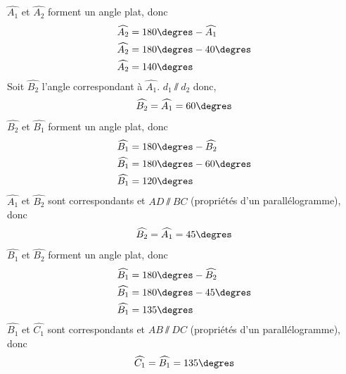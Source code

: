 %
%
    \begin{tasks}
        \task
        $\widehat{A_1}$ et $\widehat{A_2}$ forment un angle plat, donc
        \begin{align*}
            \widehat{A_2} & = 180\degres - \widehat{A_1} \\
            \widehat{A_2} & = 180\degres - 40\degres     \\
            \widehat{A_2} & = 140\degres                 \\
        \end{align*}
        \task
        Soit $\widehat{B_2}$ l'angle correspondant à $\widehat{A_1}$.
        $d_1\sslash d_2$ donc,
        \begin{equation*}
            \widehat{B_2} = \widehat{A_1} = 60\degres
        \end{equation*}
        $\widehat{B_2}$ et $\widehat{B_1}$ forment un angle plat, donc
        \begin{align*}
            \widehat{B_1} & = 180\degres - \widehat{B_2} \\
            \widehat{B_1} & = 180\degres - 60\degres     \\
            \widehat{B_1} & = 120\degres                 \\
        \end{align*}
        \task
        $\widehat{A_1}$ et $\widehat{B_2}$ sont correspondants et
        $AD\sslash BC$ (propriétés d'un parallélogramme), donc
        \begin{equation*}
            \widehat{B_2}=\widehat{A_1}=45\degres
        \end{equation*}
        $\widehat{B_1}$ et $\widehat{B_2}$ forment un angle plat, donc
        \begin{align*}
            \widehat{B_1} & = 180\degres - \widehat{B_2} \\
            \widehat{B_1} & = 180\degres - 45\degres     \\
            \widehat{B_1} & = 135\degres                 \\
        \end{align*}
        $\widehat{B_1}$ et $\widehat{C_1}$ sont correspondants et
        $AB\sslash DC$ (propriétés d'un parallélogramme), donc
        \begin{equation*}
            \widehat{C_1}=\widehat{B_1}=135\degres
        \end{equation*}
    \end{tasks}
    \pagebreak
